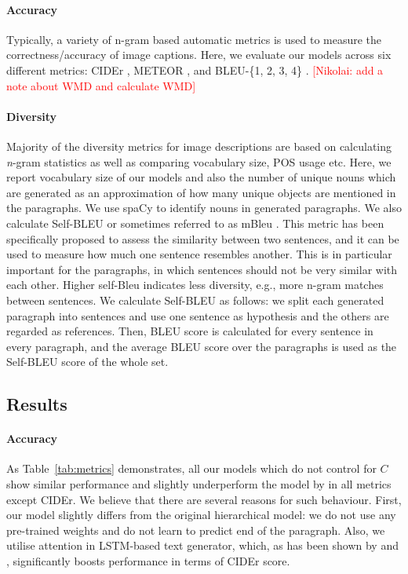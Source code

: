 \documentclass[11pt,a4paper]{article}
\newcommand{\kibitz}[2]{\ifnum\Comments=1\textcolor{#1}{#2}\fi}
\newcommand{\nikolai}[1]{\kibitz{red}      {[Nikolai: #1]}}
\begin{document}
\paragraph{Accuracy}
Typically, a variety of n-gram based automatic metrics is used to measure the correctness/accuracy of image captions.
Here, we evaluate our models across six different metrics: CIDEr \cite{vedantam2014cider}, METEOR \cite{meteor14}, and BLEU-\{1, 2, 3, 4\} \cite{bleu}.
\nikolai{add a note about WMD and calculate WMD}

\paragraph{Diversity}
Majority of the diversity metrics for image descriptions are based on calculating \textit{n}-gram statistics as well as comparing vocabulary size, POS usage etc.
Here, we report vocabulary size of our models and also the number of unique nouns which are generated as an approximation of how many unique objects are mentioned in the paragraphs. We use spaCy \cite{spacy15} to identify nouns in generated paragraphs.
We also calculate Self-BLEU \cite{Zhu2018selfbleu} or sometimes referred to as mBleu \cite{Shetty2017}.
This metric has been specifically proposed to assess the similarity between two sentences, and it can be used to measure how much one sentence resembles another. This is in particular important for the paragraphs, in which sentences should not be very similar with each other.
Higher self-Bleu indicates less diversity, e.g., more n-gram matches between sentences.
We calculate Self-BLEU as follows: we split each generated paragraph into sentences and use one sentence as hypothesis and the others are regarded as references.
Then, BLEU score is calculated for every sentence in every paragraph, and the average BLEU score over the paragraphs is used as the Self-BLEU score of the whole set.

\subsection{Results}

\paragraph{Accuracy}
As Table~\ref{tab:metrics} demonstrates, all our models which do not control for $C$ show similar performance and slightly underperform the model by  in all metrics except CIDEr.
We believe that there are several reasons for such behaviour.
First, our model slightly differs from the original hierarchical model: we do not use any pre-trained weights and do not learn to predict end of the paragraph.
Also, we utilise attention in LSTM-based text generator, which, as has been shown by  and , significantly boosts performance in terms of CIDEr score.
\end{document}
